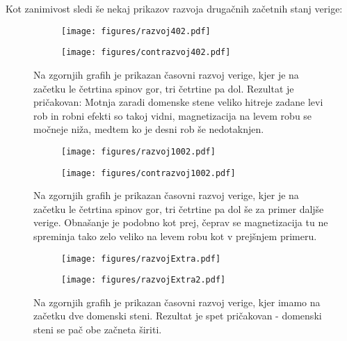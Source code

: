\documentclass{article}
\begin{document}
Kot zanimivost sledi še nekaj prikazov razvoja drugačnih začetnih stanj verige:

\begin{figure}[H]
\centering
\begin{subfigure}{.49\textwidth}
\texttt{[image: figures/razvoj402.pdf]}
\end{subfigure}
\begin{subfigure}{.49\textwidth}
\texttt{[image: figures/contrazvoj402.pdf]}
\end{subfigure}
\caption*{Na zgornjih grafih je prikazan časovni razvoj verige, kjer je na začetku le četrtina spinov gor, tri četrtine pa dol. Rezultat je pričakovan: Motnja zaradi domenske stene veliko hitreje zadane levi rob in robni efekti so takoj vidni, magnetizacija na levem robu se močneje niža, medtem ko je desni rob še nedotaknjen.}
\end{figure}

\begin{figure}[H]
\centering
\begin{subfigure}{.49\textwidth}
\texttt{[image: figures/razvoj1002.pdf]}
\end{subfigure}
\begin{subfigure}{.49\textwidth}
\texttt{[image: figures/contrazvoj1002.pdf]}
\end{subfigure}
\caption*{Na zgornjih grafih je prikazan časovni razvoj verige, kjer je na začetku le četrtina spinov gor, tri četrtine pa dol še za primer daljše verige. Obnašanje je podobno kot prej, čeprav se magnetizacija tu ne spreminja tako zelo veliko na levem robu kot v prejšnjem primeru.}
\end{figure}

\begin{figure}[H]
\centering
\begin{subfigure}{.49\textwidth}
\texttt{[image: figures/razvojExtra.pdf]}
\end{subfigure}
\begin{subfigure}{.49\textwidth}
\texttt{[image: figures/razvojExtra2.pdf]}
\end{subfigure}
\caption*{Na zgornjih grafih je prikazan časovni razvoj verige, kjer imamo na začetku dve domenski steni. Rezultat je spet pričakovan - domenski steni se pač obe začneta širiti.}
\end{figure}
\end{document}
